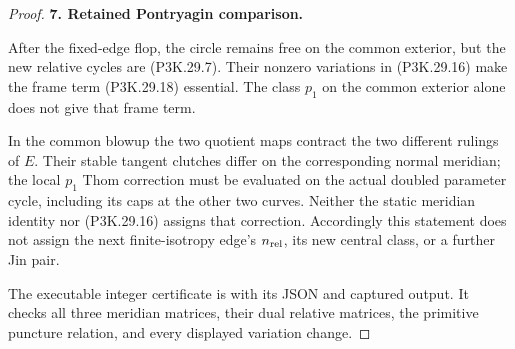\begin{proof}
\par\medskip\noindent\textbf{7. Retained Pontryagin comparison.}\enspace

After the fixed-edge flop, the circle remains free on the
common exterior, but the new relative cycles are
(P3K.29.7). Their nonzero variations in
(P3K.29.16) make the frame term (P3K.29.18) essential.
The class \(p_1\) on the common exterior alone does not
give that frame term.

In the common blowup the two quotient maps contract the
two different rulings of \(E\). Their stable tangent
clutches differ on the corresponding normal meridian;
the local \(p_1\) Thom correction must be evaluated on
the actual doubled parameter cycle, including its
caps at the other two curves. Neither the static
meridian identity nor (P3K.29.16) assigns that correction.
Accordingly this statement does not assign the next
finite-isotropy edge's \(n_{\rm rel}\), its new central
class, or a further Jin pair.

The executable integer certificate is
 with its
JSON and captured output. It checks all three meridian
matrices, their dual relative matrices, the primitive
puncture relation, and every displayed variation change.
\end{proof}
